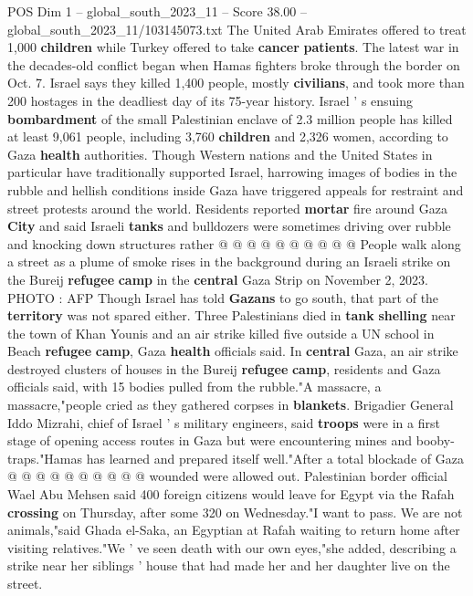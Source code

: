 \begin{textsample}{POS Dim 1 – global\_south\_2023\_11 – Score 38.00 – global\_south\_2023\_11/103145073.txt}
The United Arab Emirates offered to treat 1,000 \textbf{children} while Turkey offered to take \textbf{cancer} \textbf{patients}.
The latest war in the decades-old conflict began when Hamas fighters broke through the border on Oct. 7.
Israel says they killed 1,400 people, mostly \textbf{civilians}, and took more than 200 hostages in the deadliest day of its 75-year history.
Israel ' s ensuing \textbf{bombardment} of the small Palestinian enclave of 2.3 million people has killed at least 9,061 people, including 3,760 \textbf{children} and 2,326 women, according to Gaza \textbf{health} authorities.
Though Western nations and the United States in particular have traditionally supported Israel, harrowing images of bodies in the rubble and hellish conditions inside Gaza have triggered appeals for restraint and street protests around the world.
Residents reported \textbf{mortar} fire around Gaza \textbf{City} and said Israeli \textbf{tanks} and bulldozers were sometimes driving over rubble and knocking down structures rather @ @ @ @ @ @ @ @ @ @ People walk along a street as a plume of smoke rises in the background during an Israeli strike on the Bureij \textbf{refugee} \textbf{camp} in the \textbf{central} Gaza Strip on November 2, 2023.
PHOTO : AFP Though Israel has told \textbf{Gazans} to go south, that part of the \textbf{territory} was not spared either.
Three Palestinians died in \textbf{tank} \textbf{shelling} near the town of Khan Younis and an air strike killed five outside a UN school in Beach \textbf{refugee} \textbf{camp}, Gaza \textbf{health} officials said.
In \textbf{central} Gaza, an air strike destroyed clusters of houses in the Bureij \textbf{refugee} \textbf{camp}, residents and Gaza officials said, with 15 bodies pulled from the rubble."A massacre, a massacre,"people cried as they gathered corpses in \textbf{blankets}.
Brigadier General Iddo Mizrahi, chief of Israel ' s military engineers, said \textbf{troops} were in a first stage of opening access routes in Gaza but were encountering mines and booby-traps."Hamas has learned and prepared itself well."After a total blockade of Gaza @ @ @ @ @ @ @ @ @ @ wounded were allowed out.
Palestinian border official Wael Abu Mehsen said 400 foreign citizens would leave for Egypt via the Rafah \textbf{crossing} on Thursday, after some 320 on Wednesday."I want to pass.
We are not animals,"said Ghada el-Saka, an Egyptian at Rafah waiting to return home after visiting relatives."We ' ve seen death with our own eyes,"she added, describing a strike near her siblings ' house that had made her and her daughter live on the street.

\end{textsample}
